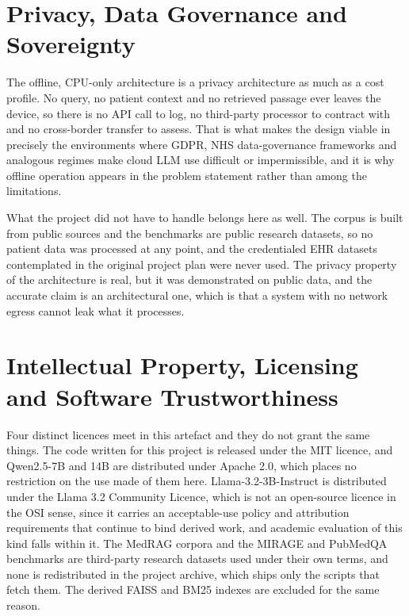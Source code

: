 \section{Privacy, Data Governance and Sovereignty}
\label{sec:lsep-privacy}

The offline, CPU-only architecture is a privacy architecture as much as a cost
profile. No query, no patient context and no retrieved passage ever leaves the
device, so there is no API call to log, no third-party processor to contract
with and no cross-border transfer to assess. That is what makes the design
viable in precisely the environments where GDPR, NHS data-governance
frameworks and analogous regimes make cloud LLM use difficult or
impermissible, and it is why offline operation appears in the problem
statement rather than among the limitations.

What the project did not have to handle belongs here as well. The corpus is
built from public sources and the benchmarks are public research datasets, so
no patient data was processed at any point, and the credentialed EHR datasets
contemplated in the original project plan were never used. The privacy
property of the architecture is real, but it was demonstrated on public data,
and the accurate claim is an architectural one, which is that a system with no
network egress cannot leak what it processes.

\section{Intellectual Property, Licensing and Software Trustworthiness}
\label{sec:lsep-ip}

Four distinct licences meet in this artefact and they do not grant the same
things. The code written for this project is released under the MIT licence,
and Qwen2.5-7B and 14B are distributed under Apache 2.0, which places no
restriction on the use made of them here. Llama-3.2-3B-Instruct is distributed
under the Llama 3.2 Community Licence, which is not an open-source licence in
the OSI sense, since it carries an acceptable-use policy and attribution
requirements that continue to bind derived work, and academic evaluation of
this kind falls within it. The MedRAG corpora and the MIRAGE and PubMedQA
benchmarks are third-party research datasets used under their own terms, and
none is redistributed in the project archive, which ships only the scripts
that fetch them. The derived FAISS and BM25 indexes are excluded for the same
reason.

